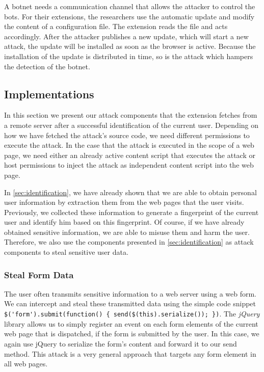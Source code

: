 	A botnet needs a communication channel that allows the attacker to control the bots. For their extensions, the researchers use the automatic update and modify the content of a configuration file. The extension reads the file and acts accordingly. After the attacker publishes a new update, which will start a new attack, the update will be installed as soon as the browser is active. Because the installation of the update is distributed in time, so is the attack which hampers the detection of the botnet.
	
\subsection{Implementations}
	
	In this section we present our attack components that the extension fetches from a remote server after a successful identification of the current user. Depending on how we have fetched the attack's source code, we need different permissions to execute the attack. In the case that the attack is executed in the scope of a web page, we need either an already active content script that executes the attack or host permissions to inject the attack as independent content script into the web page.

	In \autoref{sec:identification}, we have already shown that we are able to obtain personal user information by extraction them from the web pages that the user visits. Previously, we collected these information to generate a fingerprint of the current user and identify him based on this fingerprint. Of course, if we have already obtained sensitive information, we are able to misuse them and harm the user. Therefore, we also use the components presented in \autoref{sec:identification} as attack components to steal sensitive user data.

\subsubsection{Steal Form Data}
\label{sec:stealFormData}

	The user often transmits sensitive information to a web server using a web form. We can intercept and steal these transmitted data using the simple code snippet \lstinline|$('form').submit(function() { send($(this).serialize()); })|. The \textit{jQuery} library allows us to simply register an event on each form elements of the current web page that is dispatched, if the form is submitted by the user. In this case, we again use jQuery to serialize the form's content and forward it to our send method. This attack is a very general approach that targets any form element in all web pages.
	
